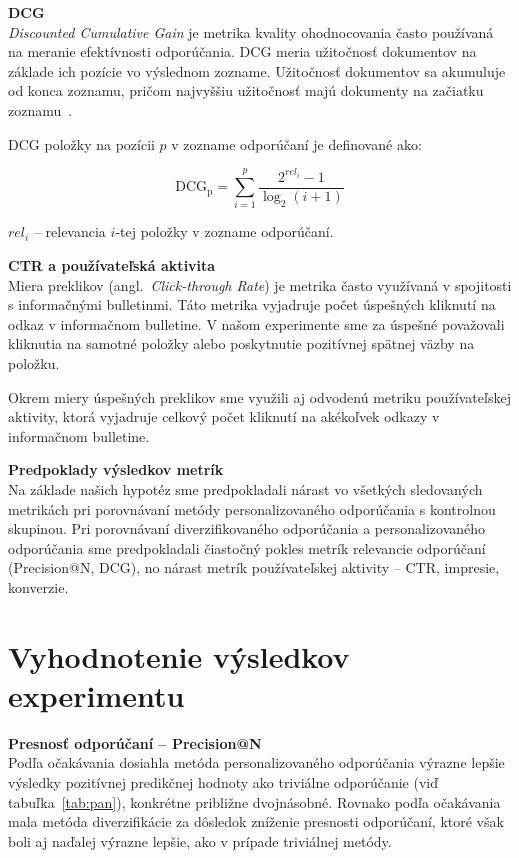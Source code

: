 \textbf{DCG}\\
\textit{Discounted Cumulative Gain} je metrika kvality ohodnocovania často používaná na meranie efektívnosti
odporúčania. DCG meria užitočnosť dokumentov na základe ich pozície vo výslednom zozname. Užitočnosť dokumentov sa akumuluje
od konca zoznamu, pričom najvyššiu užitočnosť majú dokumenty na začiatku zoznamu~\cite{Jrvelin2002}.

DCG položky na pozícii $p$ v zozname odporúčaní je definované ako:

$$\mathrm{DCG_{p}} = \sum_{i=1}^{p} \frac{ 2^{rel_{i}} - 1 }{ \log_{2}(i+1)}$$
\begin{adjustwidth}{1cm}{1cm}
$rel_i$ -- relevancia $i$-tej položky v zozname odporúčaní.\\
\end{adjustwidth}

\textbf{CTR a používateľská aktivita}\\
Miera preklikov (angl.~\emph{Click-through Rate}) je metrika často využívaná v spojitosti s informačnými bulletinmi.
Táto metrika vyjadruje počet úspešných kliknutí na odkaz v informačnom bulletine. V našom experimente sme za úspešné
považovali kliknutia na samotné položky alebo poskytnutie pozitívnej spätnej väzby na položku.

Okrem miery úspešných preklikov sme využili aj odvodenú metriku používateľskej aktivity, ktorá vyjadruje celkový počet
kliknutí na akékoľvek odkazy v informačnom bulletine.

\textbf{Predpoklady výsledkov metrík}\\
Na základe našich hypotéz sme predpokladali nárast vo všetkých sledovaných metrikách pri porovnávaní metódy personalizovaného
odporúčania s kontrolnou skupinou. Pri porovnávaní diverzifikovaného odporúčania a personalizovaného odporúčania sme
predpokladali čiastočný pokles metrík relevancie odporúčaní (Precision@N, DCG), no nárast metrík používateľskej aktivity
-- CTR, impresie, konverzie.


\section{Vyhodnotenie výsledkov experimentu}

\textbf{Presnosť odporúčaní -- Precision@N}\\
Podľa očakávania dosiahla metóda personalizovaného odporúčania výrazne lepšie výsledky pozitívnej predikčnej hodnoty
ako triviálne odporúčanie (viď tabuľka~\ref{tab:pan}), konkrétne približne dvojnásobné. Rovnako podľa očakávania mala
metóda diverzifikácie za dôsledok zníženie presnosti odporúčaní, ktoré však boli aj naďalej výrazne lepšie,
ako v prípade triviálnej metódy.

